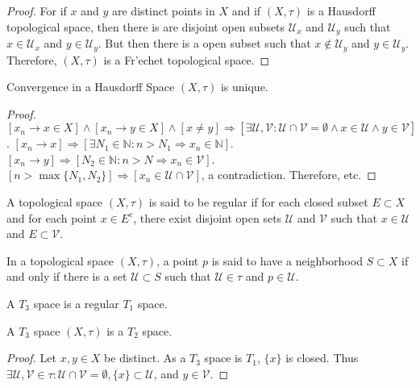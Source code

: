         \begin{proof}
            For if $x$ and $y$ are distinct points in $X$ and if
            $(X,\tau)$ is a Hausdorff topological space, then there
            is are disjoint open subsets $\mathcal{U}_{x}$ and
            $\mathcal{U}_{y}$ such that $x\in\mathcal{U}_{x}$ and
            $y\in\mathcal{U}_{y}$. But then there is a open subset
            such that $x\notin\mathcal{U}_{y}$ and
            $y\in\mathcal{U}_{y}$. Therefore, $(X,\tau)$ is a
            Fr'{e}chet topological space.
        \end{proof}
            \begin{theorem}
            Convergence in a Hausdorff Space $(X,\tau)$ is unique.
            \end{theorem}
            \begin{proof}
            $[x_n \rightarrow x\in X]\land [x_n \rightarrow y\in X]\land[x\ne y]\Rightarrow [\exists \mathcal{U},\mathcal{V}:\mathcal{U}\cap \mathcal{V}=\emptyset\land x\in \mathcal{U}\land y\in \mathcal{V}]$. $[x_n\rightarrow x]\Rightarrow [\exists N_1\in \mathbb{N}:n>N_1\Rightarrow x_n \in \mathbb{N}]$. $[x_n\rightarrow y]\Rightarrow [N_2\in \mathbb{N}:n>N\Rightarrow x_n \in \mathcal{V}]$. $[n>\max\{N_1,N_2\}]\Rightarrow [x_n \in \mathcal{U}\cap \mathcal{V}]$, a contradiction. Therefore, etc.
            \end{proof}
            \begin{definition}
            A topological space $(X,\tau)$ is said to be regular if for each closed subset $E\subset X$ and for each point $x\in E^c$, there exist disjoint open sets $\mathcal{U}$ and $\mathcal{V}$ such that $x\in \mathcal{U}$ and $E\subset \mathcal{V}$.
            \end{definition} 
            \begin{definition}
            In a topological space $(X,\tau)$, a point $p$ is said to have a neighborhood $S\subset X$ if and only if there is a set $\mathcal{U}\subset S$ such that $\mathcal{U}\in \tau$ and $p\in \mathcal{U}$.
            \end{definition}
            \begin{definition}
            A $T_3$ space is a regular $T_1$ space.
            \end{definition}
            \begin{theorem}
            A $T_3$ space $(X,\tau)$ is a $T_2$ space.
            \end{theorem}
            \begin{proof}
            Let $x,y\in X$ be distinct. As a $T_3$ space is $T_1$, $\{x\}$ is closed. Thus $\exists \mathcal{U},\mathcal{V}\in\tau: \mathcal{U}\cap\mathcal{V}=\emptyset, \{x\}\subset \mathcal{U}$, and $y\in \mathcal{V}$.
            \end{proof}
